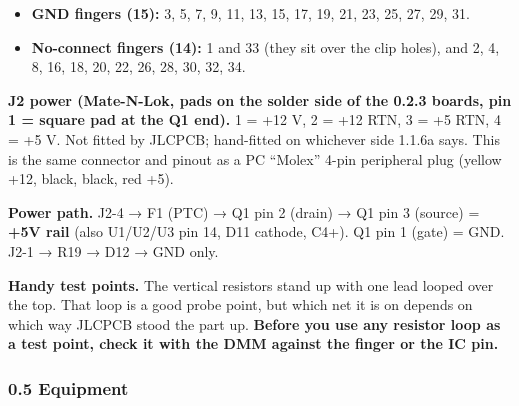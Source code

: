 \documentclass[
  10pt,
  twoside]{article}
\providecommand{\tightlist}{%
  \setlength{\itemsep}{0pt}\setlength{\parskip}{0pt}}
\begin{document}
\begin{itemize}
\tightlist
\item
  \textbf{GND fingers (15):} 3, 5, 7, 9, 11, 13, 15, 17, 19,
  21, 23, 25, 27, 29, 31.
\item
  \textbf{No-connect fingers (14):} 1 and 33 (they sit over
  the clip holes), and 2, 4, 8, 16, 18, 20, 22, 26, 28, 30,
  32, 34.
\end{itemize}

\textbf{J2 power (Mate-N-Lok, pads on the solder side of the
0.2.3 boards, pin 1 = square pad at the Q1 end).} 1 = +12 V,
2 = +12 RTN, 3 = +5 RTN, 4 = +5 V.
\textcolor[HTML]{0040A0}{Not fitted by JLCPCB; hand-fitted
on whichever side 1.1.6a says.} This is the same connector
and pinout as a PC ``Molex'' 4-pin peripheral plug (yellow
+12, black, black, red +5).

\textbf{Power path.} J2-4 → F1 (PTC) → Q1 pin 2 (drain) → Q1
pin 3 (source) = \textbf{+5V rail} (also U1/U2/U3 pin 14,
D11 cathode, C4+). Q1 pin 1 (gate) = GND. J2-1 → R19 → D12 →
GND only.

\textbf{Handy test points.} The vertical resistors stand up
with one lead looped over the top. That loop is a good probe
point, but which net it is on depends on which way JLCPCB
stood the part up. \textbf{Before you use any resistor loop
as a test point, check it with the DMM against the finger or
the IC pin.}

\hypertarget{equipment}{%
\subsubsection{0.5 Equipment}\label{equipment}}
\end{document}
